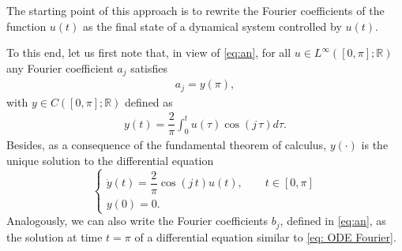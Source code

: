 \documentclass[twocolumn]{autart}    %
\begin{document}
The starting point of this approach is to rewrite the Fourier coefficients of the function $u(t)$ as the final state of a dynamical system controlled by $u(t)$. 



To this end, let us first note that, in view of \eqref{eq:an}, for all $u\in L^\infty ([0,\pi];\mathbb{R})$ any Fourier coefficient $a_j$ satisfies
\begin{align*}
	a_j = y(\pi), 
\end{align*}
with $y\in C([0,\pi];\mathbb{R})$ defined as
\begin{align*}
	y(t) = \dfrac{2}{\pi} \int_0^t u(\tau) \cos(j\, \tau) d\tau.
\end{align*}
Besides, as a consequence of the fundamental theorem of calculus, $y(\cdot)$ is the unique solution to the differential equation
\begin{equation}\label{eq: ODE Fourier}
	\begin{cases}
		\dot{y} (t) = \dfrac{2}{\pi} \cos(j\, t) u(t), \qquad  t\in [0,\pi]
		\\[5pt]
		y(0) = 0.
	\end{cases}
\end{equation}
Analogously, we can also write the Fourier coefficients $b_j$, defined in \eqref{eq:an}, as the solution at time $t=\pi$ of a differential equation similar to \eqref{eq: ODE Fourier}.
\end{document}

